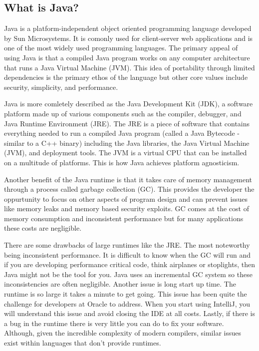 \documentclass[../../main.tex]{subfiles}
\begin{document}
\subsection{What is Java?}
Java is a platform-independent object oriented programming language developed by Sun Microsystems.
It is comonly used for client-server web applications and is one of the most widely used
programming languages. The primary appeal of using Java is that a compiled Java program works on
any computer architecture that runs a Java Virtual Machine (JVM). This idea of portability through
limited dependencies is the primary ethos of the language but other core values include security,
simplicity, and performance.

\vspace{1em}
Java is more comletely described as the Java Development Kit (JDK), a software platform made up of
various components such as the compiler, debugger, and Java Runtime Environment (JRE). The JRE is
a piece of software that contains everything needed to run a compiled Java program (called a Java
Bytecode - similar to a C++ binary) including the Java libraries, the Java Virtual Machine (JVM),
and deployment tools. The JVM is a virtual CPU that can be installed on a multitude of platforms.
This is how Java achieves platform agnosticism.

\vspace{1em}
Another benefit of the Java runtime is that it takes care of memory management through a process
called garbage collection (GC). This provides the developer the oppurtunity to focus on other
aspects of program design and can prevent issues like memory leaks and memory based security
exploits. GC comes at the cost of memory consumption and inconsistent performance but for many
applications these costs are negligible.

\vspace{1em}
There are some drawbacks of large runtimes like the JRE. The most noteworthy being inconsistent
performance. It is difficult to know when the GC will run and if you are developing performance
critical code, think airplanes or stoplights, then Java might not be the tool for you. Java uses
an incremental GC system so these inconsistencies are often negligible. Another issue is long
start up time. The runtime is so large it takes a minute to get going. This issue has been quite
the challenge for developers at Oracle to address. When you start using IntelliJ, you will
understand this issue and avoid closing the IDE at all costs. Lastly, if there is a bug in the
runtime there is very little you can do to fix your software. Although, given the incredible
complexity of modern compilers, similar issues exist within languages that don't provide runtimes.
\end{document}
